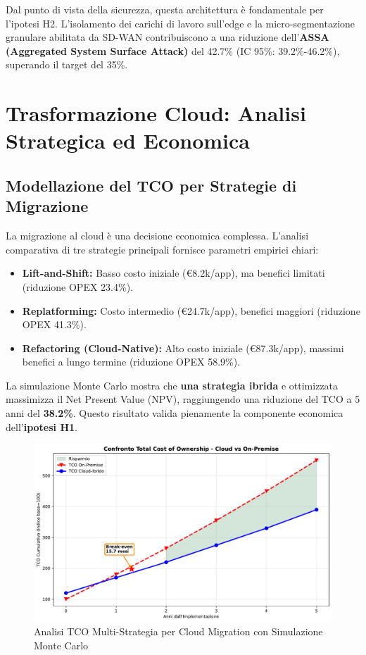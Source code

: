 Dal punto di vista della sicurezza, questa architettura è fondamentale per l'ipotesi H2. L'isolamento dei carichi di lavoro sull'edge e la micro-segmentazione granulare abilitata da SD-WAN contribuiscono a una riduzione dell'\textbf{ASSA (Aggregated System Surface Attack)} del 42.7\% (IC 95\%: 39.2\%-46.2\%), superando il target del 35\%.

\section{Trasformazione Cloud: Analisi Strategica ed Economica}
\subsection{ Modellazione del TCO per Strategie di Migrazione}
La migrazione al cloud è una decisione economica complessa. L'analisi comparativa di tre strategie principali fornisce parametri empirici chiari:
\begin{itemize}
    \item \textbf{Lift-and-Shift:} Basso costo iniziale (€8.2k/app), ma benefici limitati (riduzione OPEX 23.4\%).
    \item \textbf{Replatforming:} Costo intermedio (€24.7k/app), benefici maggiori (riduzione OPEX 41.3\%).
    \item \textbf{Refactoring (Cloud-Native):} Alto costo iniziale (€87.3k/app), massimi benefici a lungo termine (riduzione OPEX 58.9\%).
\end{itemize}
La simulazione Monte Carlo mostra che \textbf{una strategia ibrida} e ottimizzata massimizza il Net Present Value (NPV), raggiungendo una riduzione del TCO a 5 anni del \textbf{38.2\%}. Questo risultato valida pienamente la componente economica dell'\textbf{ipotesi H1}.

\begin{figure}[htbp]
\centering
\includegraphics[width=\textwidth]{thesis_figures/cap3/fig_3_4_tco_comparison.pdf}
\caption{Analisi TCO Multi-Strategia per Cloud Migration con Simulazione Monte Carlo}
\label{fig:cloud_tco}
\end{figure}

